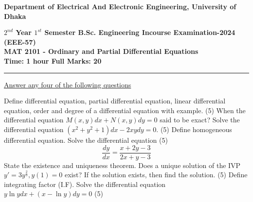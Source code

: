 \documentclass[a4paper,11pt]{exam}
\begin{document}
\newpage
\begin{center}
    \begin{large}
        {\textbf{
            Department of Electrical And Electronic Engineering, University of Dhaka \\
        }}
    \end{large}
    \textbf{$2^{nd}$ Year $1^{st}$ Semester B.Sc. Engineering Incourse Examination-2024 (EEE-57) \\
        MAT 2101 - Ordinary and Partial Differential Equations \\
        Time: 1 hour \hfill Full Marks: 20}
    \noindent\rule{\linewidth}{1.2pt}
\end{center}
\underline{Answer any four of the following questions} 
\begin{questions}
    \question Define differential equation, partial differential equation, linear differential equation, order and degree of a differential equation with example. \hfill (5)
    \question When the differential equation $M(x,y)dx + N(x,y)dy = 0$ said to be exact? Solve the differential equation $(x^2+y^2+1)dx - 2xydy = 0$. \hfill (5)
    \question Define homogeneous differential equation. Solve the differential equation \hfill (5)
    $$\dfrac{dy}{dx}=\dfrac{x+2y-3}{2x+y-3}$$
    \question State the existence and uniqueness theorem. Does a unique solution of the IVP $y' = 3y^{\frac{2}{3}}, y(1) = 0$ exist? If the solution exists, then find the solution. \hfill (5)
    \question Define integrating factor (I.F). Solve the differential equation $y\ln ydx + (x-\ln y)dy = 0$ \hfill (5)
\end{questions}
\end{document}
